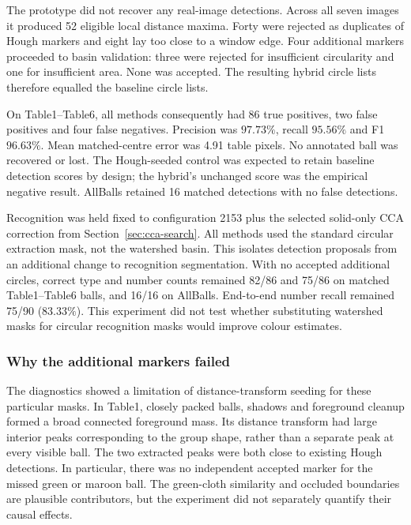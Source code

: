 


The prototype did not recover any real-image detections. Across all
seven images it produced 52 eligible local distance maxima. Forty were
rejected as duplicates of Hough markers and eight lay too close to a
window edge. Four additional markers proceeded to basin validation:
three were rejected for insufficient circularity and one for insufficient
area. None was accepted. The resulting hybrid circle lists therefore
equalled the baseline circle lists.

On Table1--Table6, all methods consequently had 86 true positives,
two false positives and four false negatives. Precision was $97.73\%$,
recall $95.56\%$ and F1 $96.63\%$. Mean matched-centre error was
4.91 table pixels. No annotated ball was recovered or lost. The
Hough-seeded control was expected to retain baseline detection scores
by design; the hybrid's unchanged score was the empirical negative result.
AllBalls retained 16 matched detections with no false detections.



Recognition was held fixed to configuration 2153 plus the selected
solid-only CCA correction from Section~\ref{sec:cca-search}. All methods
used the standard circular extraction mask, not the watershed basin.
This isolates detection proposals from an additional change to recognition
segmentation. With no accepted additional circles, correct type and
number counts remained 82/86 and 75/86 on matched Table1--Table6 balls,
and 16/16 on AllBalls. End-to-end number recall remained 75/90
($83.33\%$). This experiment did not test whether substituting watershed
masks for circular recognition masks would improve colour estimates.

\subsubsection{Why the additional markers failed}

The diagnostics showed a limitation of distance-transform seeding for
these particular masks. In Table1, closely packed balls, shadows and
foreground cleanup formed a broad connected foreground mass. Its
distance transform had large interior peaks corresponding to the group
shape, rather than a separate peak at every visible ball. The two
extracted peaks were both close to existing Hough detections. In
particular, there was no independent accepted marker for the missed
green or maroon ball. The green-cloth similarity and occluded boundaries
are plausible contributors, but the experiment did not separately
quantify their causal effects.

